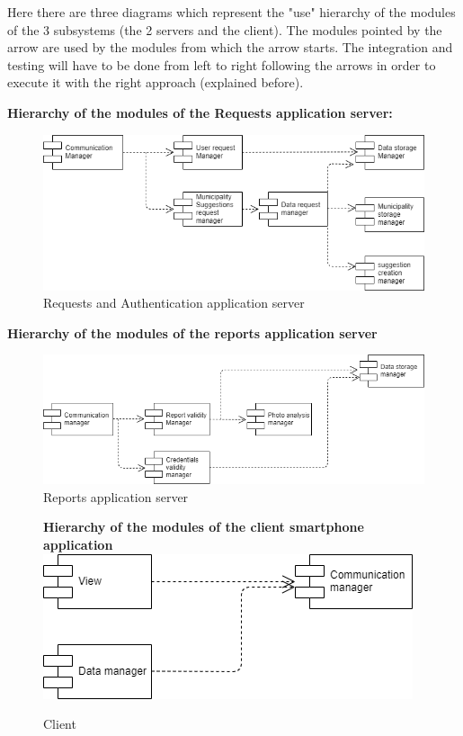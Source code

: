 \documentclass[titlepage]{article}
\begin{document}
Here there are three diagrams which represent the "use" hierarchy of the modules of the 3 subsystems (the 2 servers and the client). The modules pointed by the arrow are used by the modules from which the arrow starts. The integration and testing will have to be done from left to right following the arrows in order to execute it with the right approach (explained before).\\

\newpage

\textbf{Hierarchy of the modules of the Requests application server:}

\begin{figure}[h]
\includegraphics[scale=0.5]{Diagrams/Request application servers.png}
	\caption{Requests and Authentication application server}
\end{figure}
\FloatBarrier

\textbf{Hierarchy of the modules of the reports application server\\}
\begin{figure}[h]
\includegraphics[scale=0.5]{Diagrams/report application server.png}
	\caption{Reports application server}
\end{figure}
\FloatBarrier


\begin{figure}[h]
\textbf{Hierarchy of the modules of the client smartphone application}
\includegraphics[scale=0.5]{Diagrams/Client.png}
	\caption{Client}
\end{figure}
\FloatBarrier
\end{document}
